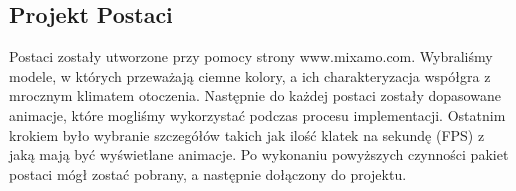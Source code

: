 \subsection{Projekt Postaci}
Postaci zostały utworzone przy pomocy strony www.mixamo.com. Wybraliśmy modele, w których przeważają ciemne kolory, a ich charakteryzacja współgra z mrocznym klimatem otoczenia. 
Następnie do każdej postaci zostały dopasowane animacje, które mogliśmy wykorzystać podczas procesu implementacji.
Ostatnim krokiem było wybranie szczegółów takich jak ilość klatek na sekundę (FPS) z jaką mają być wyświetlane animacje. 
Po wykonaniu powyższych czynności pakiet postaci mógł zostać pobrany, a następnie dołączony do projektu. 